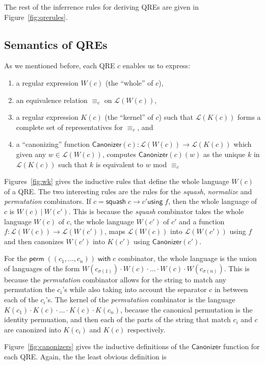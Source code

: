 \documentclass{svproc}
\newcommand{\kw}[1]{\ensuremath{\mathsf{#1}}}
\newcommand{\squash}[3]{\ensuremath{\kw{squash} \; #1 \rightarrow #2
\kw{using} \; #3}}
\newcommand{\perm}[2]{\ensuremath{\kw{perm}\; (#1)\; \kw{with}\; #2}}
\newcommand{\sep}{\ensuremath{\ | \ }}
\newcommand{\canonizer}{\ensuremath{\kw{Canonizer}}}
\newcommand{\eqrel}[1]{\ensuremath{\equiv_{#1}}}
\begin{document}
The rest of the inferrence rules for deriving QREs are given in
Figure~\ref{fig:qrerules}.
\subsection{Semantics of QREs}

As we mentioned before, each QRE $c$ enables us to express:
\begin{enumerate}
  \item a regular expression $W(c)$ (the ``whole'' of $c$),
  \item an equivalence relation $\eqrel{c}$ on $\mathcal{L}(W(c))$,
  \item a regular expression $K(c)$ (the ``kernel'' of $c$)
  such that $\mathcal{L}(K(c))$ forms a complete set of representatives for
  $\eqrel{c}$, and
  \item a ``canonizing'' function $\canonizer(c):\mathcal{L}(W(c))
  \longrightarrow \mathcal{L}(K(c))$ which given any $w \in \mathcal{L}(W(c))$,
  computes $\canonizer(c)(w)$ as the unique $k$ in $\mathcal{L}(K(c))$ such that
  $k$ is equivalent to $w$ mod $\eqrel{c}$
  \end{enumerate}
Figures~\ref{fig:wk} gives the inductive rules that define the whole language
$W(c)$ of a QRE. The two interesting rules are the rules for the
\textit{squash}, \textit{normalize} and \textit{permutation} combinators. If $c
= \squash{c}{c'}{f}$, then the whole language of $c$ is $W(c) \sep W(c')$. This
is because the \textit{squash} combinator takes the whole language $W(c)$ of
$c$, the whole language $W(c')$ of $c'$ and a function $f : \mathcal{L}(W(c))
\longrightarrow \mathcal{L}(W(c'))$, maps $\mathcal{L}(W(c))$ into
$\mathcal{L}(W(c'))$ using $f$ and then canonizes $W(c')$ into $K(c')$ using
$\canonizer(c')$.

For the $\perm{(c_1, \ldots, c_n)}{c}$ combinator, the whole language is the
union of languages of the form $W(c_{\sigma(1)}) \cdot W(c) \cdot \ldots \cdot
W(c) \cdot W(c_{\sigma(n)})$. This is because the \textit{permutation}
combinator allows for the string to match any permutation the $c_i$'s while also
taking into account the separator $c$ in between each of the $c_i$'s. The kernel
of the \textit{permutation} combinator is the language $K(c_1) \cdot K(c) \cdot
\ldots \cdot K(c) \cdot K(c_n)$, because the canonical permutation is the
identity permuation, and then each of the parts of the string that match $c_i$
and $c$ are canonized into $K(c_i)$ and $K(c)$ respectively.

Figure~\ref{fig:canonizers} gives the inductive definitions of the
$\canonizer{}$ function for each QRE. Again, the the least obvious definition
is
\end{document}
